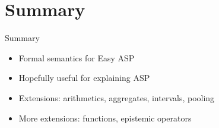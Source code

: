
\section{Summary}

\begin{frame}{Summary}
\vfill
\begin{itemize}
\item Formal semantics for Easy ASP
\bigskip
\item Hopefully useful for explaining ASP
\bigskip
\item Extensions: arithmetics, aggregates, intervals, pooling
\bigskip
\item More extensions: functions, epistemic operators
\end{itemize}
\vfill
\end{frame}
